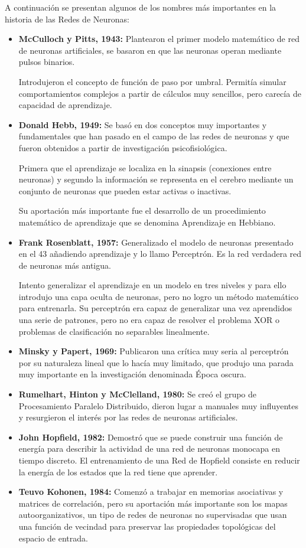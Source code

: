 \documentclass[12pt, twoside, openright]{report} %
\begin{document}
A continuación se presentan algunos de los nombres más importantes en la historia de las Redes de Neuronas:
\begin{itemize}
	\item \textbf{McCulloch y Pitts, 1943:} Plantearon el primer modelo matemático de red de neuronas artificiales, se basaron en que las neuronas operan mediante pulsos binarios.

	      Introdujeron el concepto de función de paso por umbral. Permitía simular comportamientos complejos a partir de cálculos muy sencillos, pero carecía de capacidad de aprendizaje.
	\item \textbf{Donald Hebb, 1949:} Se basó en dos conceptos muy importantes y fundamentales que han pasado en el campo de las redes de neuronas y que fueron obtenidos a partir de investigación psicofisiológica.

	      Primera que el aprendizaje se localiza en la sinapsis (conexiones entre neuronas) y segundo la información se representa en el cerebro mediante un conjunto de neuronas que pueden estar activas o inactivas.

	      Su aportación más importante fue el desarrollo de un procedimiento matemático de aprendizaje que se denomina Aprendizaje en Hebbiano.
	\item \textbf{Frank Rosenblatt, 1957:} Generalizado el modelo de neuronas presentado en el 43 añadiendo aprendizaje y lo llamo Perceptrón. Es la red verdadera red de neuronas más antigua.

	      Intento generalizar el aprendizaje en un modelo en tres niveles y para ello introdujo una capa oculta de neuronas, pero no logro un método matemático para entrenarla. Su perceptrón era capaz de generalizar una vez aprendidos una serie de patrones, pero no era capaz de resolver el problema XOR o problemas de clasificación no separables linealmente.
	\item \textbf{Minsky y Papert, 1969:} Publicaron una crítica muy seria al perceptrón por su naturaleza lineal que lo hacía muy limitado, que produjo una parada muy importante en la investigación denominada Época oscura.
	\item \textbf{Rumelhart, Hinton y McClelland, 1980:} Se creó el grupo de Procesamiento Paralelo Distribuido, dieron lugar a manuales muy influyentes y resurgieron el interés por las redes de neuronas artificiales.
	\item \textbf{John Hopfield, 1982:} Demostró que se puede construir una función de energía para describir la actividad de una red de neuronas monocapa en tiempo discreto. El entrenamiento de una Red de Hopfield consiste en reducir la energía de los estados que la red tiene que aprender.
	\item \textbf{Teuvo Kohonen, 1984:} Comenzó a trabajar en memorias asociativas y matrices de correlación, pero su aportación más importante son los mapas autoorganizativos, un tipo de redes de neuronas no supervisadas que usan una función de vecindad para preservar las propiedades topológicas del espacio de entrada.


\end{itemize}
\end{document}
